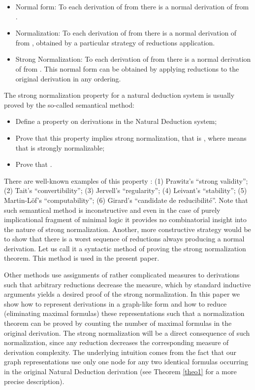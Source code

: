 \documentclass[submission,copyright,creativecommons]{eptcs}
\begin{document}
\begin{itemize}
\item Normal form: To each derivation of  from  there is 
a normal derivation of  from .
\item Normalization: To each derivation of  from  there 
is a normal derivation of  from , 
obtained by a particular strategy of reductions application. 
\item Strong Normalization: To each derivation of  from  
there is a normal derivation of  from . 
This normal form can be obtained by applying reductions to the original 
derivation in any ordering. 
\end{itemize}

The strong normalization property for a natural deduction system is usually
proved by the so-called semantical method:

\begin{itemize}
\item  Define a property  on derivations  in the Natural
Deduction system;

\item  Prove that this property implies strong normalization, that is , where  means that  is
strongly normalizable;

\item  Prove that .
\end{itemize}

There are well-known examples of this property  : (1) Prawitz's
``strong validity''; (2) Tait's ``convertibility''; (3) Jervell's
``regularity''; (4) Leivant's ``stability''; (5) Martin-L\"{o}f's
``computability''; (6) Girard's ``candidate de reducibilit\'{e}''. Note that
such semantical method is inconstructive and even in the case of purely
implicational fragment of minimal logic it provides no combinatorial insight
into the nature of strong normalization. Another, more constructive strategy
would be to show that there is a worst sequence of reductions always
producing a normal derivation. Let us call it a syntactic method of proving
the strong normalization theorem. This method is used in the present paper.

Other methods use assignments of rather complicated measures to derivations
such that arbitrary reductions decrease the measure, which by standard
inductive arguments yields a desired proof of the strong normalization. In
this paper we show how to represent  derivations in a
graph-like form and how to reduce (eliminating maximal formulas) these
representations such that a normalization theorem can be proved by counting
the number of maximal formulas in the original derivation. The strong
normalization will be a direct consequence of such normalization, since any
reduction decreases the corresponding measure of derivation complexity. The
underlying intuition comes from the fact that our graph representations use
only one node for any two identical formulas occurring in the original
Natural Deduction derivation (see Theorem \ref{theo1} for a more precise description).
\end{document}
